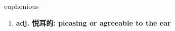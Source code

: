 
\begin{frame}
{\huge euphonious}
\begin{center}
\begin{enumerate}\Large
  \item \textbf{adj. 悦耳的: pleasing or agreeable to the ear}
\end{enumerate}
\end{center}
\end{frame}
